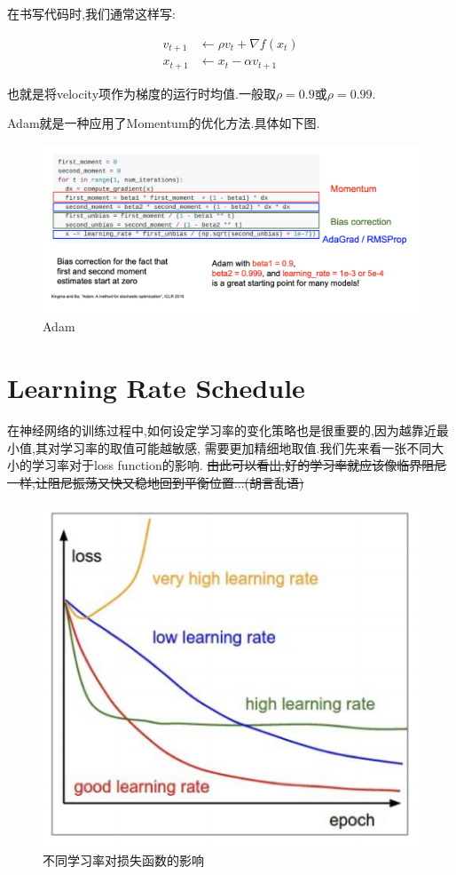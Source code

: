 在书写代码时,我们通常这样写:

\begin{equation}
	\begin{aligned}
		v_{t+1} &\leftarrow \rho v_{t} + \nabla f(x_t)
		\\
		x_{t+1} &\leftarrow x_t - \alpha v_{t+1}
	\end{aligned}
\end{equation}

也就是将velocity项作为梯度的运行时均值.一般取$\rho = 0.9$或$\rho = 0.99$.

Adam就是一种应用了Momentum的优化方法.具体如下图.

\begin{figure}[htbp]
	\centering
	\includegraphics[scale=0.65]{figures/adam.png}
	\caption{Adam}
\end{figure}

\section{Learning Rate Schedule}

在神经网络的训练过程中,如何设定学习率的变化策略也是很重要的,因为越靠近最小值,其对学习率的取值可能越敏感,
需要更加精细地取值.我们先来看一张不同大小的学习率对于loss function的影响.
\sout{由此可以看出,好的学习率就应该像临界阻尼一样,让阻尼振荡又快又稳地回到平衡位置...(胡言乱语)}

\begin{figure}[htbp]
	\centering
	\includegraphics[scale=0.65]{figures/learning_rate_schedule.png}
	\caption{不同学习率对损失函数的影响}
\end{figure}

